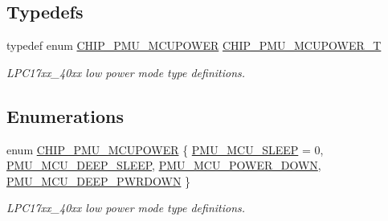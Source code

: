 \subsection*{Typedefs}
\begin{DoxyCompactItemize}
\item 
typedef enum \hyperlink{group__PMU__17XX__40XX_gae5e1b53b190a2a25a80b4a6e93c55fa5}{C\+H\+I\+P\+\_\+\+P\+M\+U\+\_\+\+M\+C\+U\+P\+O\+W\+ER} \hyperlink{group__PMU__17XX__40XX_ga724dd269fe2bbc43740331f35c3bf463}{C\+H\+I\+P\+\_\+\+P\+M\+U\+\_\+\+M\+C\+U\+P\+O\+W\+E\+R\+\_\+T}
\begin{DoxyCompactList}\small\item\em L\+P\+C17xx\+\_\+40xx low power mode type definitions. \end{DoxyCompactList}\end{DoxyCompactItemize}
\subsection*{Enumerations}
\begin{DoxyCompactItemize}
\item 
enum \hyperlink{group__PMU__17XX__40XX_gae5e1b53b190a2a25a80b4a6e93c55fa5}{C\+H\+I\+P\+\_\+\+P\+M\+U\+\_\+\+M\+C\+U\+P\+O\+W\+ER} \{ \hyperlink{group__PMU__17XX__40XX_ggae5e1b53b190a2a25a80b4a6e93c55fa5a642a6452710738e476df4c9873f8d53c}{P\+M\+U\+\_\+\+M\+C\+U\+\_\+\+S\+L\+E\+EP} = 0, 
\hyperlink{group__PMU__17XX__40XX_ggae5e1b53b190a2a25a80b4a6e93c55fa5a520bf4cb3d4ae81e7fc2b6da77117089}{P\+M\+U\+\_\+\+M\+C\+U\+\_\+\+D\+E\+E\+P\+\_\+\+S\+L\+E\+EP}, 
\hyperlink{group__PMU__17XX__40XX_ggae5e1b53b190a2a25a80b4a6e93c55fa5ae57e035fd3a4f9fa956fbc8668030f8d}{P\+M\+U\+\_\+\+M\+C\+U\+\_\+\+P\+O\+W\+E\+R\+\_\+\+D\+O\+WN}, 
\hyperlink{group__PMU__17XX__40XX_ggae5e1b53b190a2a25a80b4a6e93c55fa5a23fed3c82386a96e38fcf19bc6ec20a6}{P\+M\+U\+\_\+\+M\+C\+U\+\_\+\+D\+E\+E\+P\+\_\+\+P\+W\+R\+D\+O\+WN}
 \}\begin{DoxyCompactList}\small\item\em L\+P\+C17xx\+\_\+40xx low power mode type definitions. \end{DoxyCompactList}
\end{DoxyCompactItemize}

